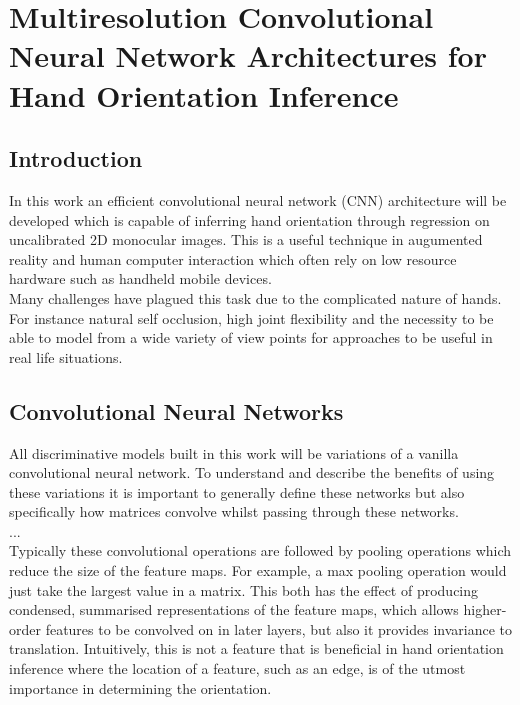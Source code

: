 \documentclass{article}
\begin{document}
\section*{Multiresolution Convolutional Neural Network Architectures for Hand Orientation Inference}

\subsection*{Introduction}
In this work an efficient convolutional neural network (CNN) architecture will be developed which is capable of inferring hand orientation through regression on uncalibrated 2D monocular images. This is a useful technique in augumented reality and human computer interaction which often rely on low resource hardware such as handheld mobile devices.\\

Many challenges have plagued this task due to the complicated nature of hands. For instance natural self occlusion, high joint flexibility and the necessity to be able to model from a wide variety of view points for approaches to be useful in real life situations. \\

\subsection{Convolutional Neural Networks}
All discriminative models built in this work will be variations of a vanilla convolutional neural network. To understand and describe the benefits of using these variations it is important to generally define these networks but also specifically how matrices convolve whilst passing through these networks.\\

... \\

Typically these convolutional operations are followed by pooling operations which reduce the size of the feature maps. For example, a max pooling operation would just take the largest value in a matrix. This both has the effect of producing condensed, summarised representations of the feature maps, which allows higher-order features to be convolved on in later layers, but also it provides invariance to translation. Intuitively, this is not a feature that is beneficial in hand orientation inference where the location of a feature, such as an edge, is of the utmost importance in determining the orientation. \\
\end{document}

